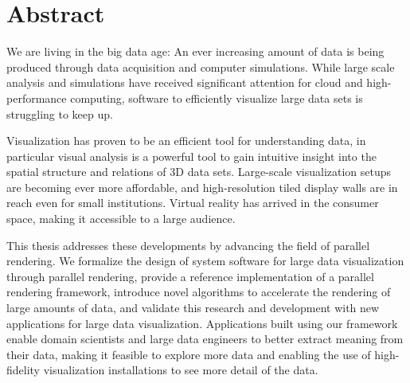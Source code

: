 
\chapter*{Abstract} 

We are living in the big data age: An ever increasing amount of data is being
produced through data acquisition and computer simulations. While large scale
analysis and simulations have received significant attention for cloud and
high-performance computing, software to efficiently visualize large data sets
is struggling to keep up.

Visualization has proven to be an efficient tool for understanding data, in
particular visual analysis is a powerful tool to gain intuitive insight into
the spatial structure and relations of 3D data sets. Large-scale visualization
setups are becoming ever more affordable, and high-resolution tiled display
walls are in reach even for small institutions. Virtual reality has arrived in
the consumer space, making it accessible to a large audience.

This thesis addresses these developments by advancing the field of parallel
rendering. We formalize the design of system software for large data
visualization through parallel rendering, provide a reference implementation of
a parallel rendering framework, introduce novel algorithms to accelerate the
rendering of large amounts of data, and validate this research and development
with new applications for large data visualization. Applications built using
our framework enable domain scientists and large data engineers to better
extract meaning from their data, making it feasible to explore more data and
enabling the use of high-fidelity visualization installations to see more
detail of the data.

